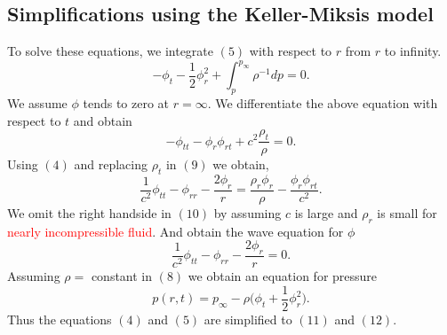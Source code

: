 \documentclass[a4paper]{article}
\begin{document}
\subsection*{Simplifications using the Keller-Miksis model}
To solve these equations, we integrate $(5)$ with respect to $r$ from $r$ to infinity.
\begin{equation}
    -\phi_t - \frac{1}{2}\phi_r^2 + \int_{p}^{p_\infty} \rho^{-1} dp = 0.
\end{equation}
We assume $\phi$ tends to zero at $r = \infty$. We differentiate the above equation with respect to $t$ and obtain
\begin{equation}
    -\phi_{tt} - \phi_r\phi_{rt} + c^2\frac{\rho_t}{\rho} = 0.
\end{equation}
Using $(4)$ and replacing $\rho_t$ in $(9)$ we obtain,
\begin{equation}
    \frac{1}{c^2} \phi_{tt} - \phi_{rr} - \frac{2 \phi_r}{r} = \frac{\rho_r \phi_r}{\rho} - \frac{\phi_r \phi_{rt}}{c^2}.
\end{equation}
We omit the right handside in $(10)$ by assuming $c$ is large and $\rho_r$ is small for \textcolor{red}{nearly incompressible fluid}. And obtain the wave equation for $\phi$
\begin{equation}
    \frac{1}{c^2} \phi_{tt} - \phi_{rr} - \frac{2 \phi_r}{r} = 0.
\end{equation}
Assuming $\rho = $ constant in $(8)$ we obtain an equation for pressure
\begin{equation}
    p(r, t) = p_{\infty} - \rho \Big(\phi_t + \frac{1}{2}\phi_r^2 \Big).
\end{equation}
Thus the equations $(4)$ and $(5)$ are simplified to $(11)$ and $(12)$.
\end{document}
